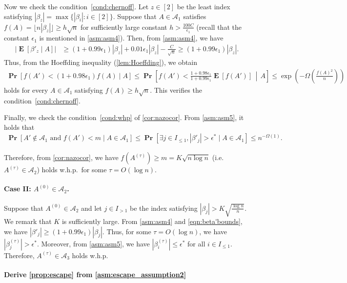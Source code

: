 \documentclass[letterpaper,11pt]{article}
\renewcommand\Pr{\mathop{\mathbf{Pr}}}
\DeclareMathOperator{\E}{\mathbf{E}}
\begin{document}
Now we check the condition~\ref{cond:chernoff}.
Let $z\in[2]$ be the least index satisfying $|\beta_z|=\max\{|\beta_i|:i\in[2]\}$.
Suppose that $A\in \mathcal{A}_1$ satisfies $f(A)=\lfloor n|\beta_z|\rfloor \geq h\sqrt{n}$ for sufficiently large constant $h>\frac{100 C}{\epsilon_1}$ (recall that the constant $\epsilon_1$ is mentioned in \ref{asm:asm4}).
Then, from \ref{asm:asm4}, we have
\begin{align*}
|\E[\beta'_z \mid A]| &\geq (1+0.99\epsilon_1)|\beta_z| + 0.01\epsilon_1|\beta_z|-\frac{C}{\sqrt{n}}
\geq (1+0.99\epsilon_1)|\beta_z|.
\end{align*}
Thus, from the Hoeffding inequality (\cref{lem:Hoeffding}), we obtain
\begin{align*}
\Pr[f(A')<(1+0.98\epsilon_1)f(A) \mid A]
\leq
\Pr\left[f(A')<\frac{1+0.98\epsilon_1}{1+0.99\epsilon_1}\E[f(A')]\,\middle|\,A\right]
\leq
\exp\left(-\Omega\left(\frac{f(A)^2}{n}\right)\right)
\end{align*}
holds for every $A\in \mathcal{A}_1$ satisfying $f(A)\geq h\sqrt{n}$.
This verifies the condition~\ref{cond:chernoff}.

Finally, we check the condition~\ref{cond:whp} of \cref{cor:nazocor}.
From \ref{asm:asm5}, it holds that
\begin{align*}
\Pr[A'\not\in \mathcal{A}_1\text{ and }f(A')<m \mid A\in \mathcal{A}_1]
\leq
\Pr[\exists j\in I_{\leq 1},|\beta'_j|>\epsilon^* \mid A\in\mathcal{A}_1]
\leq
n^{-\Omega(1)}.
\end{align*}

Therefore, from \cref{cor:nazocor}, we have $f(A^{(\tau)})\geq m=K\sqrt{n\log n}$ (i.e.~$A^{(\tau)}\in \mathcal{A}_2$) holds w.h.p.~for some $\tau=O(\log n)$.


\paragraph*{Case I\hspace{-.1em}I: $A^{(0)}\in \mathcal{A}_2$.}
Suppose that $A^{(0)}\in\mathcal{A}_2$ and let $j\in I_{>1}$ be the index satisfying $|\beta_j|>K\sqrt{\frac{\log n}{n}}$.
We remark that $K$ is sufficiently large.
From \ref{asm:asm4} and \cref{eqn:beta'bounds}, we have $|\beta'_j|\geq (1+0.99\epsilon_1)|\beta_j|$.
Thus, for some $\tau=O(\log n)$, we have $|\beta^{(\tau)}_j|>\epsilon^*$.
Moreover, from \ref{asm:asm5}, we have $|\beta^{(\tau)}_i|\leq\epsilon^*$ for all $i\in I_{\leq 1}$.
Therefore, $A^{(\tau)}\in \mathcal{A}_3$ holds w.h.p.

\paragraph*{Derive \cref{prop:escape} from \cref{asm:escape_assumption2}}
\end{document}

